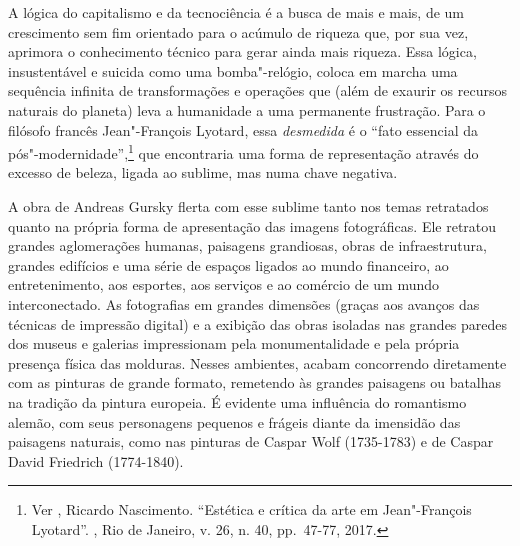 A lógica do capitalismo e da tecnociência é a busca de mais e mais, de
um crescimento sem fim orientado para o acúmulo de riqueza que, por sua
vez, aprimora o conhecimento técnico para gerar ainda mais riqueza. Essa
lógica, insustentável e suicida como uma bomba"-relógio, coloca em marcha
uma sequência infinita de transformações e operações que (além de
exaurir os recursos naturais do planeta) leva a humanidade a uma
permanente frustração. Para o filósofo francês Jean"-François Lyotard,
essa \emph{desmedida} é o ``fato essencial da
pós"-modernidade'',\footnote{Ver , Ricardo Nascimento. ``Estética e
  crítica da arte em Jean"-François Lyotard''. {}, Rio de
  Janeiro, v. 26, n. 40, pp.~47-77, 2017.} que encontraria uma forma de
representação através do excesso de beleza, ligada ao sublime, mas numa
chave negativa.

A obra de Andreas Gursky flerta com esse sublime tanto nos temas
retratados quanto na própria forma de apresentação das imagens
fotográficas. Ele retratou grandes aglomerações humanas, paisagens
grandiosas, obras de infraestrutura, grandes edifícios e uma série de
espaços ligados ao mundo financeiro, ao entretenimento, aos esportes,
aos serviços e ao comércio de um mundo interconectado. As fotografias em
grandes dimensões (graças aos avanços das técnicas de impressão digital)
e a exibição das obras isoladas nas grandes paredes dos museus e
galerias impressionam pela monumentalidade e pela própria presença
física das molduras. Nesses ambientes, acabam concorrendo diretamente
com as pinturas de grande formato, remetendo às grandes paisagens ou
batalhas na tradição da pintura europeia. É evidente uma influência do
romantismo alemão, com seus personagens pequenos e frágeis diante da
imensidão das paisagens naturais, como nas pinturas de Caspar Wolf (1735-1783) e de Caspar David Friedrich (1774-1840).


